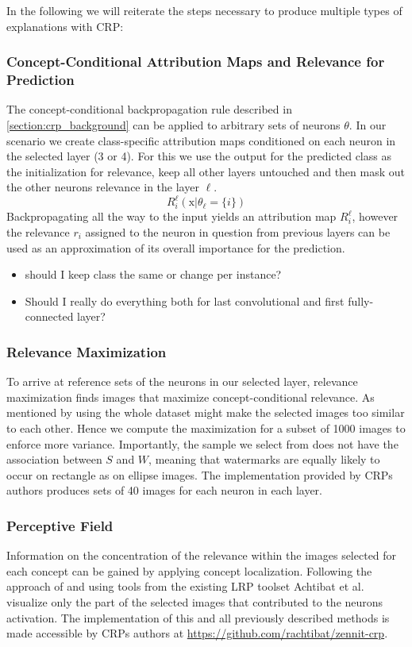 In the following we will reiterate the steps necessary to produce multiple types of explanations with CRP:

\subsubsection{Concept-Conditional Attribution Maps and Relevance for Prediction}
The concept-conditional backpropagation rule described in \cref{section:crp_background} can be applied to arbitrary sets of neurons $\theta$. In our scenario we create class-specific attribution maps conditioned on each neuron in the selected layer (3 or 4). For this we use the output for the predicted class as the initialization for relevance, keep all other layers untouched and then mask out the other neurons relevance in the layer $\ell$. 
\begin{equation}
    R_{i}^{\ell}(\mathrm{x} |\theta_{\ell}=\{i\}) 
\end{equation}
Backpropagating all the way to the input yields an attribution map $R_i^{\ell}$, however the relevance $r_i$ assigned to the neuron in question from previous layers can be used as an approximation of its overall importance for the prediction.

\begin{itemize}
    \item should I keep class the same or change per instance?
    \item Should I really do everything both for last convolutional and first fully-connected layer?
\end{itemize}

{\color{gray} \subsubsection{Relevance Maximization}
To arrive at reference sets of the neurons in our selected layer, relevance maximization finds images that maximize concept-conditional relevance. As mentioned by \cite{Achtibat2022} using the whole dataset might make the selected images too similar to each other. Hence we compute the maximization for a subset of 1000 images to enforce more variance. Importantly, the sample we select from does not have the association between $S$ and $W$, meaning that watermarks are equally likely to occur on rectangle as on ellipse images. 
The implementation provided by CRPs authors produces sets of 40 images for each neuron in each layer. 

\subsubsection{Perceptive Field}
Information on the concentration of the relevance within the images selected for each concept can be gained by applying concept localization. Following the approach of \cite{Yeh2020} and using tools from the existing LRP toolset \cite{Anders2023} Achtibat et al. visualize only the part of the selected images that contributed to the neurons activation. 
The implementation of this and all previously described methods is made accessible by CRPs authors at \url{https://github.com/rachtibat/zennit-crp}.
}


